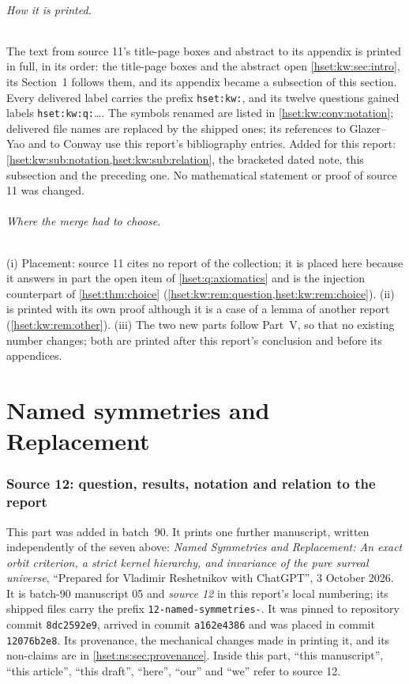 \documentclass[11pt,letterpaper]{article}
\theoremstyle{definition}
\theoremstyle{remark}
\begin{document}
\paragraph{How it is printed.} The text from source 11's title-page boxes and
abstract to its appendix is printed in full, in its order: the title-page
boxes and the abstract open \cref{hset:kw:sec:intro}, its Section~1 follows
them, and its appendix became a subsection of this section. Every delivered
label carries the prefix \texttt{hset:kw:}, and its twelve questions gained
labels \texttt{hset:kw:q:}\dots. The symbols renamed are listed in
\cref{hset:kw:conv:notation}; delivered file names are replaced by the shipped
ones; its references to Glazer--Yao and to Conway use this report's
bibliography entries. Added for this report:
\cref{hset:kw:sub:notation,hset:kw:sub:relation}, the bracketed dated note,
this subsection and the preceding one. No mathematical statement or proof of
source 11 was changed.

\paragraph{Where the merge had to choose.} (i) Placement: source 11 cites no
report of the collection; it is placed here because it answers in part the
open item of \cref{hset:q:axiomatics} and is the injection counterpart of
\cref{hset:thm:choice} (\cref{hset:kw:rem:question,hset:kw:rem:choice}).
(ii)  is printed with its own proof although it is a
case of a lemma of another report (\cref{hset:kw:rem:other}). (iii) The two
new parts follow Part~V, so that no existing number changes; both are printed
after this report's conclusion and before its appendices.

\part{Named symmetries and Replacement}\label{hset:ns:part}

\section{Source 12: question, results, notation and relation to the report}
\label{hset:ns:sec:intro}\label{hset:ns:sec:motivation}

This part was added in batch~90. It prints one further manuscript, written
independently of the seven above: \emph{Named Symmetries and Replacement: An
exact orbit criterion, a strict kernel hierarchy, and invariance of the pure
surreal universe}, ``Prepared for Vladimir Reshetnikov with ChatGPT'', 3 October
2026. It is batch-90 manuscript 05 and \emph{source 12} in this report's local
numbering; its shipped files carry the prefix \texttt{12-named-symmetries-}. It
was pinned to repository commit \texttt{8dc2592e9}, arrived in commit
\texttt{a162e4386} and was placed in commit \texttt{12076b2e8}. Its provenance,
the mechanical changes made in printing it, and its non-claims are in
\cref{hset:ns:sec:provenance}. Inside this part, ``this manuscript'', ``this
article'', ``this draft'', ``here'', ``our'' and ``we'' refer to source 12.
\end{document}

